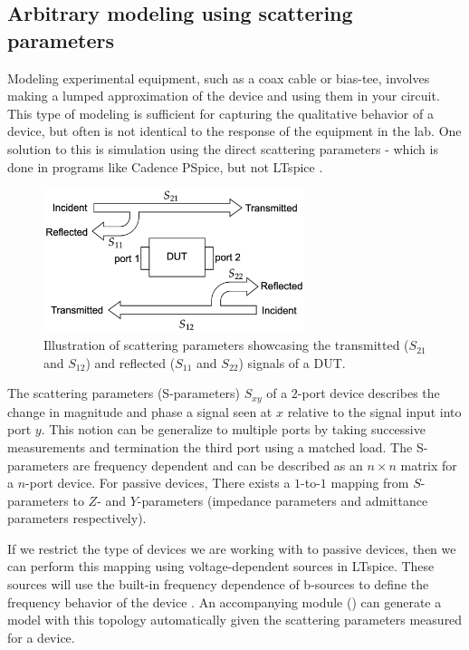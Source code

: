\subsection{Arbitrary modeling using scattering parameters}

Modeling experimental equipment, such as a coax cable or bias-tee, involves making a 
lumped approximation of the device and using them in your circuit. 
This type of modeling is sufficient for capturing the qualitative behavior of a device,
but often is not identical to the response of the equipment in the lab.
One solution to this is simulation using the direct scattering parameters - which is
done in programs like Cadence PSpice, but not LTspice \cite{hspice}.

\begin{figure}[h]
    \centering
    \includegraphics[width=3in]{figs/sxy_diagram.png}
    \caption{Illustration of scattering parameters showcasing the transmitted ($S_{21}$ and $S_{12}$) and reflected ($S_{11}$ and $S_{22}$) signals of a DUT.}
    \label{fig:sxy}
\end{figure}

The scattering parameters (S-parameters) $S_{xy}$ of a $2$-port device describes the
change in magnitude and phase a signal seen at $x$ relative to the signal 
input into port $y$. This notion can be generalize to multiple ports
by taking successive measurements and termination the third port using a
matched load. The S-parameters are frequency dependent and can be described
as an $n\times n$ matrix for a $n$-port device. For passive devices, There exists a 
$1$-to-$1$ mapping from $S$-parameters to $Z$- and $Y$-parameters (impedance 
parameters and admittance parameters respectively).

If we restrict the type of devices we are working with to passive devices,
then we can perform this mapping using voltage-dependent sources in 
LTspice. These sources will use the built-in frequency dependence of b-sources to
define the frequency behavior of the device \cite{microsim}. An accompanying 
module () can generate a model with this topology
automatically given the scattering parameters measured for a device.

